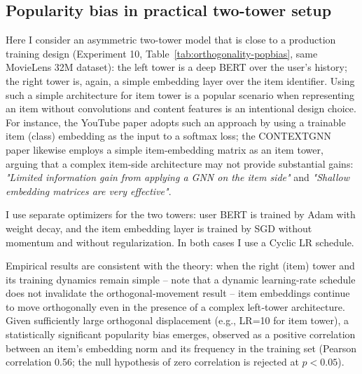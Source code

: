 \subsection{Popularity bias in practical two-tower setup}

Here I consider an asymmetric two-tower model that is close to a production training design (Experiment 10, Table~\ref{tab:orthogonality-popbias}, same MovieLens 32M dataset): the left tower is a deep BERT over the user's history; the right tower is, again, a simple embedding layer over the item identifier. 
Using such a simple architecture for item tower is a popular scenario when representing an item without convolutions and content features is an intentional design choice. 
For instance, the YouTube paper adopts such an approach by using a trainable item (class) embedding as the input to a softmax loss; 
the CONTEXTGNN paper likewise employs a simple item-embedding matrix as an item tower, arguing that a complex item-side architecture may not provide substantial gains: \emph{"Limited information gain from applying a GNN on the item side"} and \emph{"Shallow embedding matrices are very effective"}.

I use separate optimizers for the two towers: user BERT is trained by Adam with weight decay, and the item embedding layer is trained by SGD without momentum and without regularization. 
In both cases I use a Cyclic LR schedule. 

Empirical results are consistent with the theory: when the right (item) tower and its training dynamics remain simple -- note that a dynamic learning-rate schedule does not invalidate the orthogonal‑movement result -- item embeddings continue to move orthogonally even in the presence of a complex left‑tower architecture.
Given sufficiently large orthogonal displacement (e.g., LR=10 for item tower), a statistically significant popularity bias emerges, observed as a positive correlation between an item’s embedding norm and its frequency in the training set (Pearson correlation 0.56; the null hypothesis of zero correlation is rejected at $p<0.05$).


